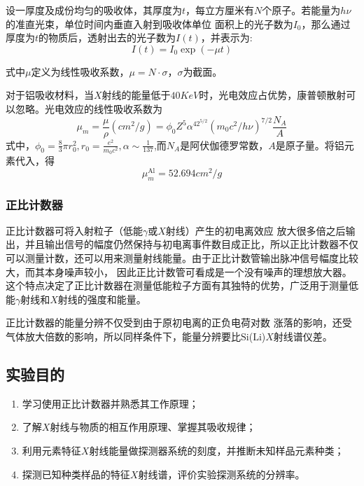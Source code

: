 \documentclass{article}
\begin{document}
设一厚度及成份均匀的吸收体，其厚度为$t$，每立方厘米有$N$个原子。若能量为$h\nu$的准直光束，单位时间内垂直入射到吸收体单位
面积上的光子数为$I_0$，那么通过厚度为$t$的物质后，透射出去的光子数为$I(t)$，并表示为:
\begin{equation}
    I(t) = I_0\exp(−\mu t) 
\end{equation}

式中$\mu$定义为线性吸收系数，$\mu=N\cdot\sigma$，$\sigma$为截面。

对于铝吸收材料，当$X$射线的能量低于$40\si{KeV}$时，光电效应占优势，康普顿散射可以忽略。光电效应的线性吸收系数为
\begin{equation}
    \mu_m = \frac{\mu}{\rho}(\si{cm^2\per g})=\phi_0 Z^5 \alpha^42^{5/2}(m_0c^2/h\nu)^{7/2}\frac{N_A}{A}
\end{equation}
式中，$\phi_0 = \frac{8}{3}\pi r_0^2, r_0 = \frac{e^2}{m_0c^2},\alpha\sim\frac{1}{137}$,而$N_A$是阿伏伽德罗常数，$A$是原子量。将铝元素代入，得
\begin{equation}
    \mu_m^{\text{Al}} = 52.694\si{cm^2\per g}
\end{equation}
\subsubsection{正比计数器}
正比计数器可将入射粒子（低能$\gamma$或$X$射线）产生的初电离效应
放大很多倍之后输出，并且输出信号的幅度仍然保持与初电离事件数目成正比，所以正比计数器不仅可以测量计数，还可以用来测量射线能量。由于正比计数管输出脉冲信号幅度比较大，而其本身噪声较小，
因此正比计数管可看成是一个没有噪声的理想放大器。这个特点决定了正比计数器在测量低能粒子方面有其独特的优势，广泛用于测量低
能$\gamma$射线和$X$射线的强度和能量。

正比计数器的能量分辨不仅受到由于原初电离的正负电荷对数
涨落的影响，还受气体放大倍数的影响，所以同样条件下，能量分辨要比$\text{Si}$($\text{Li}$)$X$射线谱仪差。
    \subsection{实验目的}
    \begin{enumerate}
        \item 学习使用正比计数器并熟悉其工作原理；
        \item 了解$X$射线与物质的相互作用原理、掌握其吸收规律；
        \item 利用元素特征$X$射线能量做探测器系统的刻度，并推断未知样品元素种类；
        \item 探测已知种类样品的特征$X$射线谱，评价实验探测系统的分辨率。
    \end{enumerate}
\end{document}
